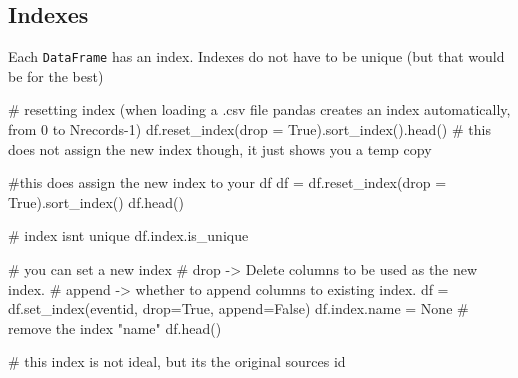 \documentclass[
  letterpaper,
  DIV=11,
  numbers=noendperiod]{scrreprt}
\newenvironment{Shaded}{\begin{snugshade}}{\end{snugshade}}
\newcommand{\CommentTok}[1]{\textcolor[rgb]{0.37,0.37,0.37}{#1}}
\newcommand{\NormalTok}[1]{\textcolor[rgb]{0.00,0.23,0.31}{#1}}
\newcommand{\OperatorTok}[1]{\textcolor[rgb]{0.37,0.37,0.37}{#1}}
\newcommand{\StringTok}[1]{\textcolor[rgb]{0.13,0.47,0.30}{#1}}
\newcommand{\VariableTok}[1]{\textcolor[rgb]{0.07,0.07,0.07}{#1}}
\begin{document}
\subsection{Indexes}\label{indexes}

Each \texttt{DataFrame} has an index. Indexes do not have to be unique
(but that would be for the best)

\begin{Shaded}
\begin{Highlighting}[]
\CommentTok{\# resetting index (when loading a .csv file pandas creates an index automatically, from 0 to Nrecords{-}1)}
\NormalTok{df.reset\_index(drop }\OperatorTok{=} \VariableTok{True}\NormalTok{).sort\_index().head() }\CommentTok{\# this does not assign the new index though, it just shows you a temp copy}
\end{Highlighting}
\end{Shaded}

\begin{Shaded}
\begin{Highlighting}[]
\CommentTok{\#this does assign the new index to your df}
\NormalTok{df }\OperatorTok{=}\NormalTok{ df.reset\_index(drop }\OperatorTok{=} \VariableTok{True}\NormalTok{).sort\_index() }
\NormalTok{df.head()}
\end{Highlighting}
\end{Shaded}

\begin{Shaded}
\begin{Highlighting}[]
\CommentTok{\# index isn\textquotesingle{}t unique}
\NormalTok{df.index.is\_unique}
\end{Highlighting}
\end{Shaded}

\begin{Shaded}
\begin{Highlighting}[]
\CommentTok{\# you can set a new index}
\CommentTok{\# drop {-}\textgreater{} Delete columns to be used as the new index.}
\CommentTok{\# append {-}\textgreater{}  whether to append columns to existing index.}
\NormalTok{df }\OperatorTok{=}\NormalTok{ df.set\_index(}\StringTok{\textquotesingle{}eventid\textquotesingle{}}\NormalTok{, drop}\OperatorTok{=}\VariableTok{True}\NormalTok{, append}\OperatorTok{=}\VariableTok{False}\NormalTok{)}
\NormalTok{df.index.name }\OperatorTok{=} \VariableTok{None} \CommentTok{\# remove the index "name"}
\NormalTok{df.head()}

\CommentTok{\# this index is not ideal, but it\textquotesingle{}s the original source\textquotesingle{}s id}
\end{Highlighting}
\end{Shaded}
\end{document}
